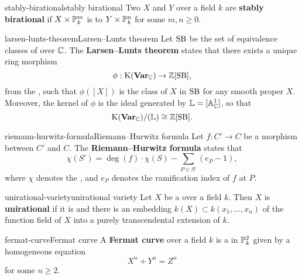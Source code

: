 \begin{topic}{stably-birational}{stably birational}
    Two  $X$ and $Y$ over a field $k$ are \textbf{stably birational} if $X \times \mathbb{P}^m_k$ is  to $Y \times \mathbb{P}^n_k$ for some $m, n \ge 0$.
\end{topic}

\begin{topic}{larsen-lunts-theorem}{Larsen--Lunts theorem}
    Let $\textup{SB}$ be the set of  equivalence classes of    over $\mathbb{C}$. The \textbf{Larsen--Lunts theorem} states that there exists a unique ring morphism
    \[ \phi : \textup{K}(\textbf{Var}_{\mathbb{C}}) \to \mathbb{Z}[\textup{SB}] , \]
    from the , such that $\phi([X])$ is the class of $X$ in $\textup{SB}$ for any smooth proper $X$. Moreover, the kernel of $\phi$ is the ideal generated by $\mathbb{L} = [\mathbb{A}^1_{\mathbb{C}}]$, so that
    \[ \textup{K}(\textbf{Var}_{\mathbb{C}}) / (\mathbb{L}) \cong \mathbb{Z}[\textup{SB}] . \]
\end{topic}

\begin{topic}{riemann-hurwitz-formula}{Riemann--Hurwitz formula}
    Let $f : C' \to C$ be a morphism between    $C'$ and $C$. The \textbf{Riemann--Hurwitz formula} states that
    \[ \chi(S') = \deg(f) \cdot \chi(S) - \sum_{P \in S'} (e_P - 1) , \]
    where $\chi$ denotes the , and $e_P$ denotes the ramification index of $f$ at $P$.
\end{topic}

\begin{topic}{unirational-variety}{unirational variety}
    Let $X$ be a  over a field $k$. Then $X$ is \textbf{unirational} if it is  and there is an embedding $k(X) \subset k(x_1, \ldots, x_n)$ of the function field of $X$ into a purely transcendental extension of $k$.
\end{topic}

\begin{topic}{fermat-curve}{Fermat curve}
    A \textbf{Fermat curve} over a field $k$ is a   in $\mathbb{P}^2_k$ given by a homogeneous equation
    \[ X^n + Y^n = Z^n \]
    for some $n \ge 2$.
\end{topic}

